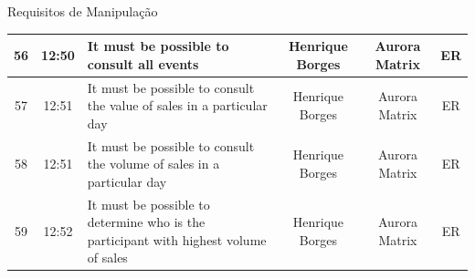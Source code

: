 \documentclass[compress,svgnames,handout,13.7pt]{beamer}
\begin{document}
\begin{frame}{Requisitos de Manipulação}
\begin{table}[!ht]
{\begin{tabular}{ | c | c |p{10.5cm} | c | c | c |}
        56 & 12:50 & It must be possible to consult all events & Henrique Borges & Aurora Matrix & ER \\ \hline
        57 & 12:51 & It must be possible to consult the value of sales in a particular day & Henrique Borges & Aurora Matrix & ER \\ \hline
        58 & 12:51 & It must be possible to consult the volume of sales in a particular day & Henrique Borges & Aurora Matrix & ER \\ \hline
        59 & 12:52 & It must be possible to determine who is the participant with highest volume of sales & Henrique Borges & Aurora Matrix & ER \\ \hline
    \end{tabular}%
}
\end{table}
\end{frame}
\end{document}

